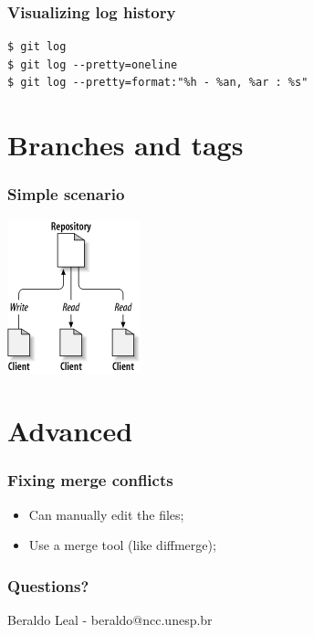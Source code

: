 \documentclass{beamer}
\begin{document}
\begin{frame}[fragile]
\frametitle{Visualizing log history}
\begin{lstlisting}
$ git log
$ git log --pretty=oneline
$ git log --pretty=format:"%h - %an, %ar : %s"
\end{lstlisting}
\end{frame}

\section{Branches and tags}
\begin{frame}
\frametitle{Simple scenario}
\begin{center}
  \includegraphics[width=\textwidth,height=0.6\textheight,keepaspectratio]{imgs/screen06.png}
\end{center}
\end{frame}


\section{Advanced}

\begin{frame}
\frametitle{Fixing merge conflicts}
\begin{itemize}
\item Can manually edit the files;
\item Use a merge tool (like diffmerge);
\end{itemize}
\end{frame}


\begin{frame}
\frametitle{Questions?}

Beraldo Leal - beraldo@ncc.unesp.br
\end{frame}

\end{document}
